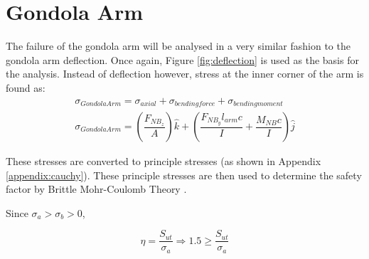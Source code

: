 \documentclass[../main.tex]{subfiles}
\begin{document}
\section{Gondola Arm} \label{bearingArm}
The failure of the gondola arm will be analysed in a very similar fashion to the gondola arm deflection. Once again, Figure \ref{fig:deflection} is used as the basis for the analysis. Instead of deflection however, stress at the inner corner of the arm is found as:
\begin{align}
	\sigma _{Gondola Arm} = \sigma _{axial} + \sigma _{bending force} + \sigma _{bending moment} \\ \label{armStress}
	\sigma _{Gondola Arm}  = \left(\dfrac{F_{NB_{z}}}{A}\right)\hat{k} + \left(\dfrac{F_{NB_{y}}l_{arm}c}{I}  + \dfrac{M_{NB}c}{I} \right) \hat{j}
\end{align}

These stresses are converted to principle stresses (as shown in Appendix \ref{appendix:cauchy}). These principle stresses are then used to determine the safety factor by Brittle Mohr-Coulomb Theory \cite[227]{shigley}.

Since $\sigma _a > \sigma _b > 0$,

\begin{equation}
	\eta = \dfrac{S_{ut}}{\sigma _a} \Rightarrow 1.5 \geq \dfrac{S_{ut}}{\sigma _a}
\end{equation}
\end{document}
